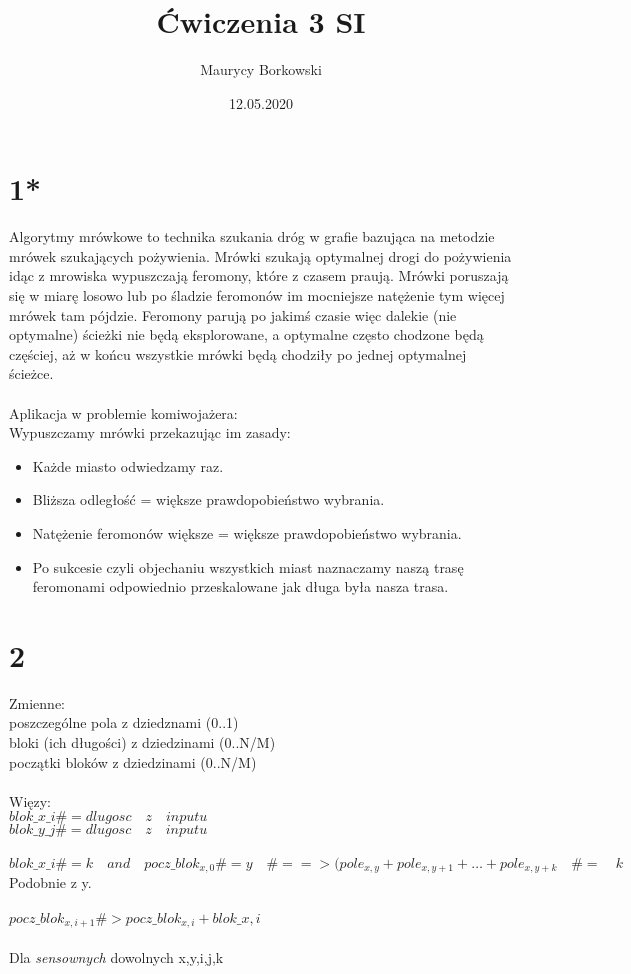 \documentclass{article}
\title{Ćwiczenia 3 SI}
\date{12.05.2020}
\author{Maurycy Borkowski}
\begin{document}
\maketitle
\section{1*}
Algorytmy mrówkowe to technika szukania dróg w grafie bazująca na metodzie mrówek szukających pożywienia. Mrówki szukają optymalnej drogi do pożywienia idąc z mrowiska wypuszczają feromony, które z czasem praują. Mrówki poruszają się w miarę losowo lub po śladzie feromonów im mocniejsze natężenie tym więcej mrówek tam pójdzie. Feromony parują po jakimś czasie więc dalekie (nie optymalne) ścieżki nie będą eksplorowane, a optymalne często chodzone będą częściej, aż w końcu wszystkie mrówki będą chodziły po jednej optymalnej ścieżce.\\\\
Aplikacja w problemie komiwojażera:\\
Wypuszczamy mrówki przekazując im zasady:
\begin{itemize}
\item Każde miasto odwiedzamy raz.
\item Bliższa odległość = większe prawdopobieństwo wybrania.
\item Natężenie feromonów większe = większe prawdopobieństwo wybrania.
\item Po sukcesie czyli objechaniu wszystkich miast naznaczamy naszą trasę feromonami odpowiednio przeskalowane jak długa była nasza trasa.
\end{itemize}

\section{2}
Zmienne:\\
poszczególne pola z dziedznami (0..1)\\
bloki (ich długości) z dziedzinami (0..N/M)\\
początki bloków z dziedzinami (0..N/M)\\\\
Więzy:\\
$blok\_{x}\_{i} \#= dlugosc \quad z \quad inputu$\\
$blok\_{y}\_{j} \#= dlugosc \quad z \quad inputu$\\\\
$blok\_{x}\_{i} \#= k \quad and \quad pocz\_blok_{x,0} \#= y \quad \#==> (pole_{x,y} + pole_{x,y + 1} + \dots + pole_{x,y+k} \quad \#= \quad k$\\Podobnie z y.\\\\
$
pocz\_blok_{x,i+1} \#> pocz\_blok_{x,i} + blok\_{x,i}
$\\\\
Dla \textit{sensownych} dowolnych x,y,i,j,k\\
\end{document}
